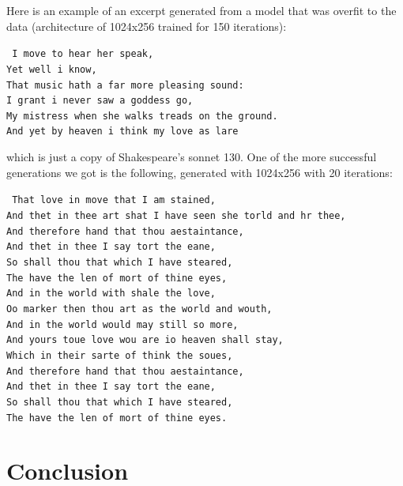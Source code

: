 \indent Here is an example of an excerpt generated from a model that was overfit to the data (architecture of 1024x256 trained for 150 iterations): \\
\begin{small}
\texttt{
    I move to hear her speak, \\
    Yet well i know, \\
    That music hath a far more pleasing sound: \\
    I grant i never saw a goddess go, \\
    My mistress when she walks treads on the ground. \\
    And yet by heaven i think my love as lare \\
} 
\end{small}
which is just a copy of Shakespeare's sonnet 130. One of the more successful generations we got is the following, generated with 1024x256 with 20 iterations: \\
\begin{small}
\texttt{
    That love in move that I am stained, \\
    And thet in thee art shat I have seen she torld and hr thee, \\
    And therefore hand that thou aestaintance, \\
    And thet in thee I say tort the eane, \\
    So shall thou that which I have steared, \\
    The have the len of mort of thine eyes, \\
    And in the world with shale the love, \\
    Oo marker then thou art as the world and wouth, \\
    And in the world would may still so more, \\
    And yours toue love wou are io heaven shall stay, \\
    Which in their sarte of think the soues, \\
    And therefore hand that thou aestaintance, \\
    And thet in thee I say tort the eane, \\
    So shall thou that which I have steared, \\
    The have the len of mort of thine eyes. \\
}
\end{small}


\section{Conclusion}
\medskip

